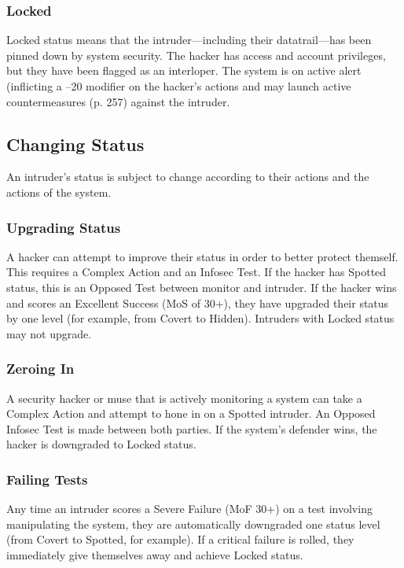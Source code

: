 \subsubsection{Locked}

Locked status means that the intruder—including their 
datatrail—has been pinned down by system security. 
The hacker has access and account privileges, but they 
have been flagged as an interloper. The system is on 
active alert (inflicting a –20 modifier on the hacker's actions
and may launch active countermeasures (p. 257)
against the intruder.

\subsection{Changing Status}

An intruder's status is subject to change according to 
their actions and the actions of the system.

\subsubsection{Upgrading Status}

A hacker can attempt to improve their status in order 
to better protect themself. This requires a Complex 
Action and an Infosec Test. If the hacker has Spotted 
status, this is an Opposed Test between monitor and 
intruder. If the hacker wins and scores an Excellent 
Success (MoS of 30+), they have upgraded their status 
by one level (for example, from Covert to Hidden). 
Intruders with Locked status may not upgrade.

\subsubsection{Zeroing In}

A security hacker or muse that is actively monitoring 
a system can take a Complex Action and attempt to 
hone in on a Spotted intruder. An Opposed Infosec Test 
is made between both parties. If the system's defender 
wins, the hacker is downgraded to Locked status.

\subsubsection{Failing Tests}

Any time an intruder scores a Severe Failure (MoF 
30+) on a test involving manipulating the system, they 
are automatically downgraded one status level (from 
Covert to Spotted, for example). If a critical failure 
is rolled, they immediately give themselves away and 
achieve Locked status.

